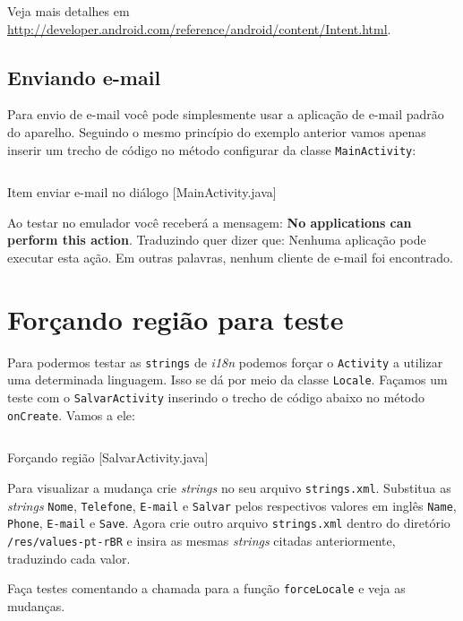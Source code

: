 Veja mais detalhes em
\url{http://developer.android.com/reference/android/content/Intent.html}.

\subsection{Enviando e-mail}

Para envio de e-mail você pode simplesmente usar a aplicação de e-mail
padrão do aparelho. Seguindo o mesmo princípio do exemplo anterior vamos
apenas inserir um trecho de código no método configurar da classe
\texttt{MainActivity}:

\begin{listing}[H]
  \inputminted[linenos=true,frame=bottomline,tabsize=3]{ java }{ source/MainActivity-11.java }
  \caption{Item enviar e-mail no diálogo [MainActivity.java]}
\end{listing}

Ao testar no emulador você receberá a mensagem: \textbf{No applications
can perform this action}. Traduzindo quer dizer que: Nenhuma aplicação
pode executar esta ação. Em outras palavras, nenhum cliente de e-mail
foi encontrado.

\section{Forçando região para teste}

Para podermos testar as \texttt{strings} de \emph{i18n} podemos forçar o
\texttt{Activity} a utilizar uma determinada linguagem. Isso se dá por
meio da classe \texttt{Locale}. Façamos um teste com o
\texttt{SalvarActivity} inserindo o trecho de código abaixo no método
\texttt{onCreate}. Vamos a ele:

\begin{listing}[H]
  \inputminted[linenos=true,frame=bottomline,tabsize=3]{ java }{ source/SalvarActivity-5.java }
  \caption{Forçando região [SalvarActivity.java]}
\end{listing}

Para visualizar a mudança crie \emph{strings} no seu arquivo
\texttt{strings.xml}. Substitua as \emph{strings} \texttt{Nome},
\texttt{Telefone}, \texttt{E-mail} e \texttt{Salvar} pelos respectivos
valores em inglês \texttt{Name}, \texttt{Phone}, \texttt{E-mail} e
\texttt{Save}. Agora crie outro arquivo \texttt{strings.xml} dentro do
diretório \texttt{/res/values-pt-rBR} e insira as mesmas \emph{strings}
citadas anteriormente, traduzindo cada valor.

Faça testes comentando a chamada para a função \texttt{forceLocale} e
veja as mudanças.

